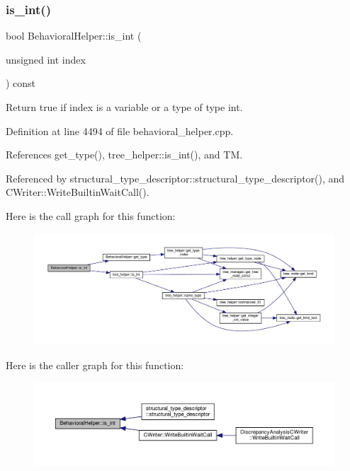 \subsubsection{\texorpdfstring{is\+\_\+int()}{is\_int()}}
{\footnotesize\ttfamily bool Behavioral\+Helper\+::is\+\_\+int (\begin{DoxyParamCaption}\item[{unsigned int}]{index }\end{DoxyParamCaption}) const\hspace{0.3cm}{\ttfamily [virtual]}}



Return true if index is a variable or a type of type int. 



Definition at line 4494 of file behavioral\+\_\+helper.\+cpp.



References get\+\_\+type(), tree\+\_\+helper\+::is\+\_\+int(), and TM.



Referenced by structural\+\_\+type\+\_\+descriptor\+::structural\+\_\+type\+\_\+descriptor(), and C\+Writer\+::\+Write\+Builtin\+Wait\+Call().

Here is the call graph for this function\+:
\nopagebreak
\begin{figure}[H]
\begin{center}
\leavevmode
\includegraphics[width=350pt]{dd/db2/classBehavioralHelper_abad4a8f3a5f0846bc2b10b3da91dd423_cgraph}
\end{center}
\end{figure}
Here is the caller graph for this function\+:
\nopagebreak
\begin{figure}[H]
\begin{center}
\leavevmode
\includegraphics[width=350pt]{dd/db2/classBehavioralHelper_abad4a8f3a5f0846bc2b10b3da91dd423_icgraph}
\end{center}
\end{figure}
\mbox{\label{classBehavioralHelper_afc5180b10e4bf31167ea60c00d30361a}} 
